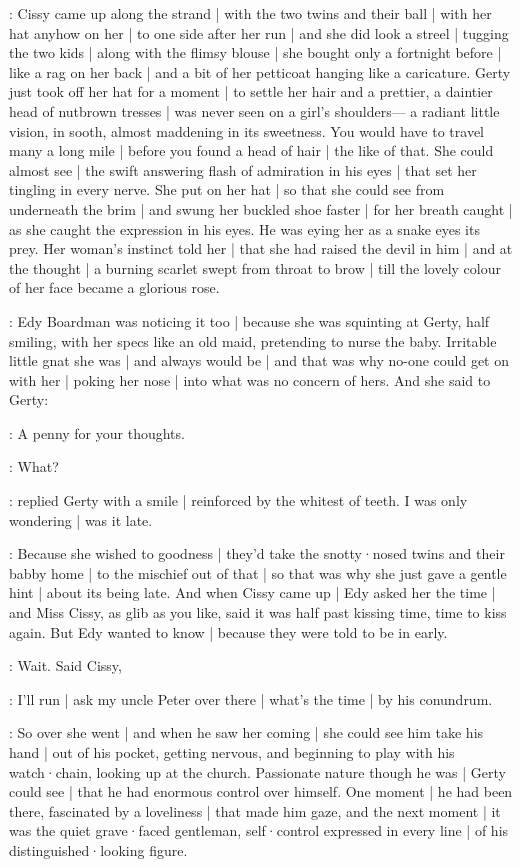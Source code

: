 :
Cissy came up along the strand |
with the two twins
and their ball |
with her hat anyhow on her |
to one side after her run |
and she did look a streel |
tugging the two kids |
along with the flimsy blouse |
she bought only a fortnight before |
like a rag on her back |
and a bit of her petticoat
hanging like a caricature.
Gerty just took off her hat for a moment |
to settle her hair
and a prettier,
a daintier head of nutbrown tresses |%
was never seen on a girl's shoulders—%
a radiant little vision,
in sooth,
almost maddening
in its sweetness.
You would have to travel
many a long mile |
before you found
a head of hair |
the like of that.
She could almost see |
the swift answering flash of admiration in his eyes |
that set her tingling
in every nerve.
She put on her hat |
so that she could see from underneath
the brim |
and swung her buckled shoe faster |
for her breath caught |
as she caught the expression
in his eyes.
He was eying her
as a snake eyes its prey.
Her woman's instinct told her |
that she had raised the devil in him |
and at the thought |
a burning scarlet
swept from throat to brow |
till the lovely colour of her face
became a glorious rose.%

:
Edy Boardman was noticing it too |
because she was squinting at Gerty,
half smiling,
with her specs
like an old maid,
pretending to nurse the baby.
Irritable little gnat she was |
and always would be |
and that was why no-one could get on with her |
poking her nose |
into what was no concern of hers.
And she said to Gerty:

\edy:
A penny for your thoughts.

\gerty:
What?

:
replied Gerty
with a smile |
reinforced by the whitest of teeth.
I was only wondering |
was it late.

:
Because
she wished to goodness |
they'd take the snotty·nosed twins and their babby home |
to the mischief
out of that |%
so that was
why she just gave a gentle hint |
about its being late.
And when Cissy came up |
Edy asked her the time |
and Miss Cissy,
as glib as you like,
said it was half past kissing time,
time to kiss again.
But Edy wanted to know |
because they were told
to be in early.

\cissy:
Wait.
Said Cissy,

\cissy:
I'll run |
ask my uncle Peter over there |
what's the time |
by his conundrum.

:
So over she went |
and when he saw her coming |
she could see him take his hand |
out of his pocket,
getting nervous,
and beginning to play with his watch·chain,
looking up at the church.
Passionate nature though he was |
Gerty could see |
that he had enormous control over himself.%
One moment |
he had been there,
fascinated by a loveliness |
that made him gaze,
and the next moment |
it was the quiet grave·faced gentleman,
self·control expressed in every line |
of his distinguished·looking figure.

